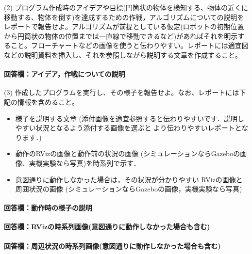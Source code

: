 \documentclass[12pt, xelatex,ja=standard,jafont=noto]{bxjsarticle}
\newif\ifdraft
\begin{document}
\begin{itembox}[l]{(2)}
プログラム作成時のアイデアや目標(円筒状の物体を検知する、物体の近くに移動する、物体を倒す)を達成するための作戦，アルゴリズムについての説明をレポートで報告せよ。アルゴリズムが前提としている仮定(ロボットの初期位置から円筒状の物体の位置までは一直線で移動できるなど)があればそれを明示すること。フローチャートなどの画像を使うと伝わりやすい。レポートには適宜図などの説明資料を挿入し、それを参照しながら説明する文章を作成すること。
\end{itembox}

\paragraph{回答欄：アイデア，作戦についての説明}
\ifdraft
アイデアや作戦について図や画像を交えながら詳しく説明する．
\fi

\begin{itembox}[l]{(3)}
作成したプログラムを実行し、その様子を報告せよ。なお、レポートには下記の情報を含めること。
\begin{itemize}
    \item 様子を説明する文章 (添付画像を適宜参照すると伝わりやすいです．説明しやすい状況となるよう添付する画像を選ぶと より伝わりやすいレポートとなります．)
    \item 動作のRVizの画像と動作前の状況の画像 (シミュレーションならGazeboの画像、実機実験なら写真)を時系列で示す．
    \item 意図通りに動作しなかった場合は，その状況が分かりやすい RVizの画像と周囲状況の画像 (シミュレーションならGazeboの画像，実機実験なら写真)
\end{itemize}
\end{itembox}

\paragraph{回答欄：動作時の様子の説明}
\ifdraft
動作時の様子を説明する文章を記載する．
\fi

\paragraph{回答欄：RVizの時系列画像(意図通りに動作しなかった場合も含む)}
\ifdraft
RVizの時系列画像を貼り付ける
\fi

\paragraph{回答欄：周辺状況の時系列画像(意図通りに動作しなかった場合も含む)}
\ifdraft
周辺状況の時系列画像を貼り付ける
\fi
\end{document}
